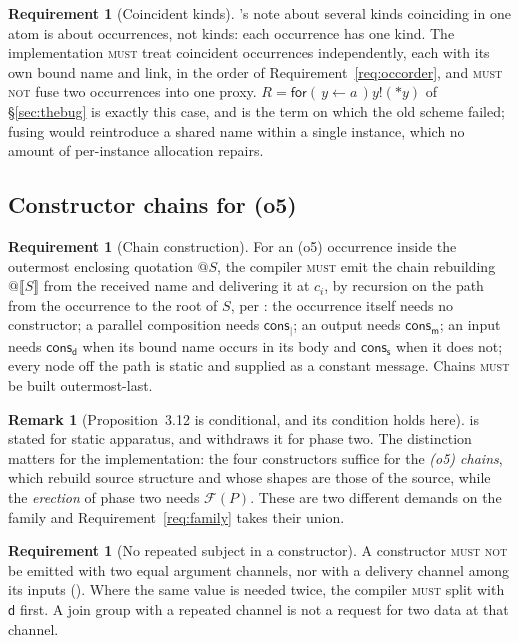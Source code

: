 \documentclass[11pt,a4paper]{article}
\makeatletter
\newcommand{\MUST}{\textsc{must}}
\newcommand{\MUSTNOT}{\textsc{must not}}
\newcommand{\quo}[1]{@#1}
\newcommand{\drp}[1]{{*}#1}
\newcommand{\inp}[3]{\mathsf{for}(\,#1 \leftarrow #2\,)#3}
\newcommand{\out}[2]{#1!(#2)}
\newcommand{\enc}[1]{\llbracket #1 \rrbracket}
\newcommand{\mm}{\mathsf{m}}
\newcommand{\dd}{\mathsf{d}}
\newcommand{\sy}{\mathsf{s}}
\newcommand{\cons}{\mathsf{cons}}
\theoremstyle{definition}
\newtheorem{requirement}[definition]{Requirement}
\newtheorem{remark}[definition]{Remark}
\theoremstyle{plain}
\makeatother
\begin{document}
\begin{requirement}[Coincident kinds]\label{req:coincide}
\cite[Table~1]{draft3}'s note about several kinds coinciding in one atom is
about occurrences, not kinds: each occurrence has one kind. The
implementation \MUST{} treat coincident occurrences independently, each with
its own bound name and link, in the order of
Requirement~\ref{req:occorder}, and \MUSTNOT{} fuse two occurrences into one
proxy. $R = \inp{y}{a}{\out{y}{\drp{y}}}$ of \S\ref{sec:thebug} is exactly
this case, and is the term on which the old scheme failed; fusing would
reintroduce a shared name within a single instance, which no amount of
per-instance allocation repairs.
\end{requirement}

\subsection{Constructor chains for (o5)}

\begin{requirement}[Chain construction]\label{req:chain}
For an (o5) occurrence inside the outermost enclosing quotation $\quo{S}$, the
compiler \MUST{} emit the chain rebuilding $\quo{\enc{S}}$ from the received
name and delivering it at $c_{i}$, by recursion on the path from the
occurrence to the root of $S$, per \cite[Prop.~3.12]{draft3}: the occurrence
itself needs no constructor; a parallel composition needs $\cons_{\mid}$; an
output needs $\cons_{\mm}$; an input needs $\cons_{\dd}$ when its bound name
occurs in its body and $\cons_{\sy}$ when it does not; every node off the path
is static and supplied as a constant message. Chains \MUST{} be built
outermost-last.
\end{requirement}

\begin{remark}[Proposition~3.12 is conditional, and its condition holds
here]\label{rem:prop311}
\cite[Prop.~3.12]{draft3} is stated for static apparatus, and
\cite[Rem.~3.13]{draft3} withdraws it for phase two. The distinction matters
for the implementation: the four constructors suffice for the \emph{(o5)
chains}, which rebuild source structure and whose shapes are those of the
source, while the \emph{erection} of phase two needs
$\mathcal{F}(P)$. These are two different demands on the family and
Requirement~\ref{req:family} takes their union.
\end{remark}

\begin{requirement}[No repeated subject in a constructor]\label{req:norepeat}
A constructor \MUSTNOT{} be emitted with two equal argument channels, nor with
a delivery channel among its inputs (\cite[Rem.~3.4]{draft3}). Where the same
value is needed twice, the compiler \MUST{} split with $\dd$ first. A join
group with a repeated channel is not a request for two data at that channel.
\end{requirement}
\end{document}
